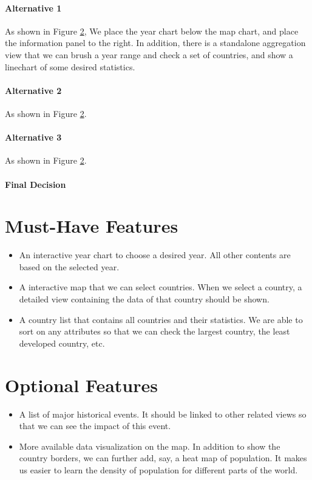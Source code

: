 \documentclass[12pt, fullpage,letterpaper]{article}
\begin{document}
\paragraph{Alternative 1}
As shown in Figure \ref{}, 
We place the year chart below the map chart, and place the information panel to the right.
In addition, there is a standalone aggregation view that we can brush a year range and check a set of countries, and
show a linechart of some desired statistics.

\paragraph{Alternative 2}
As shown in Figure \ref{}.

\paragraph{Alternative 3}
As shown in Figure \ref{}.

\paragraph{Final Decision}




\section{Must-Have Features}
\begin{itemize}
    \item An interactive year chart to choose a desired year. All other contents are based on the selected year.
    \item A interactive map that we can select countries. When we select a country, a detailed view containing the data of that country should be shown.
    \item A country list that contains all countries and their statistics. We are able to sort on any attributes so that we can check the largest country, the least developed country, etc.
\end{itemize}
\section{Optional Features}
\begin{itemize}
    \item A list of major historical events. It should be linked to other related views so that we can see the impact of this event.
    \item More available data visualization on the map. In addition to show the country borders, we can further add, say, a heat map of population. It makes us easier to learn the density of population for different parts of the world.
\end{itemize}
\end{document}
